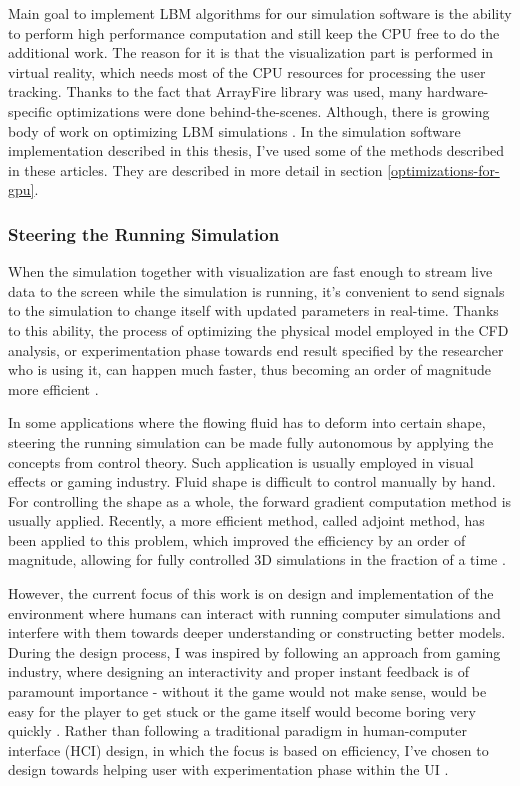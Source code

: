 Main goal to implement LBM algorithms for our simulation software is the ability to perform high performance computation and still keep the CPU free to do the additional work. The reason for it is that the visualization part is performed in virtual reality, which needs most of the CPU resources for processing the user tracking. Thanks to the fact that ArrayFire library was used, many hardware-specific optimizations were done behind-the-scenes. Although, there is growing body of work on optimizing LBM simulations \citep{wangInteractive3DFluid2019, wittmannLatticeBoltzmannBenchmark2018, tranPerformanceOptimization3D2017, kornerParallelLatticeBoltzmann2006, harwoodParallelisationInteractiveLatticeBoltzmann2017, harwoodREALTIMEMODELLINGSIMULATION}. In the simulation software implementation described in this thesis, I've used some of the methods described in these articles. They are described in more detail in section \ref{optimizations-for-gpu}.

\subsubsection{Steering the Running Simulation}
When the simulation together with visualization are fast enough to stream live data to the screen while the simulation is running, it's convenient to send signals to the simulation to change itself with updated parameters in real-time. Thanks to this ability, the process of optimizing the physical model employed in the CFD analysis, or experimentation phase towards end result specified by the researcher who is using it, can happen much faster, thus becoming an order of magnitude more efficient \citep{kreylos2002}. 

In some applications where the flowing fluid has to deform into certain shape, steering the running simulation can be made fully autonomous by applying the concepts from control theory. Such application is usually employed in visual effects or gaming industry. Fluid shape is difficult to control manually by hand. For controlling the shape as a whole, the forward gradient computation method is usually applied. Recently, a more efficient method, called adjoint method, has been applied to this problem, which improved the efficiency by an order of magnitude, allowing for fully controlled 3D simulations in the fraction of a time \citep{mcnamaraFluidControl2004}.

However, the current focus of this work is on design and implementation of the environment where humans can interact with running computer simulations and interfere with them towards deeper understanding or constructing better models. During the design process, I was inspired by following an approach from gaming industry, where designing an interactivity and proper instant feedback is of paramount importance - without it the game would not make sense, would be easy for the player to get stuck or the game itself would become boring very quickly \citep{victorMagicInk2006}. Rather than following a traditional paradigm in human-computer interface (HCI) design, in which the focus is based on efficiency, I've chosen to design towards helping user with experimentation phase within the UI \citep{spadaforaDesigningBehaviorInteractive2016}. 

